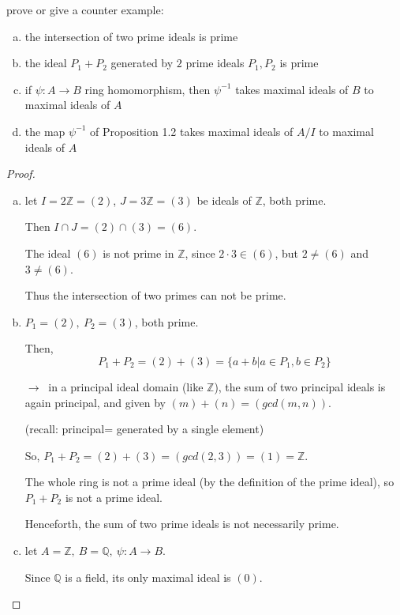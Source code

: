 \documentclass{article}
\theoremstyle{definition}
\newenvironment{ex}[1]
{\renewcommand\theinnerex{#1}\innerex}
{\endinnerex}
\begin{document}
\begin{ex}{R.1.6}
  prove or give a counter example:
  \begin{enumerate}[a.]
    \item the intersection of two prime ideals is prime
    \item the ideal $P_1+P_2$ generated by $2$ prime ideals $P_1,P_2$ is prime
    \item if $\psi: A \longrightarrow B$ ring homomorphism, then $\psi^{-1}$ takes maximal ideals of $B$ to maximal ideals of $A$
    \item the map $\psi^{-1}$ of Proposition 1.2 takes maximal ideals of $A/I$
      to maximal ideals of $A$
  \end{enumerate}
\end{ex}
\begin{proof}
  \begin{enumerate}[a.]
    \item let $I = 2 \mathbb{Z} = (2)$, $J = 3 \mathbb{Z} = (3)$ be ideals of $\mathbb{Z}$, both prime.

      Then $I \cap J = (2) \cap (3) = (6)$.

      The ideal $(6)$ is not prime in $\mathbb{Z}$, since $2 \cdot 3 \in (6)$, but $2 \neq (6)$ and $3 \neq (6)$.

      Thus the intersection of two primes can not be prime.

    \item $P_1=(2),~ P_2=(3)$, both prime.

      Then,
      $$P_1 + P_2 = (2)+(3)=\{ a+b | a \in P_1, b \in P_2 \}$$

      $\longrightarrow~$ in a principal ideal domain (like $\mathbb{Z}$), the sum of two principal ideals is again principal, and given by $(m)+(n)=(gcd(m,n))$.

      (recall: principal= generated by a single element)

      So, $P_1+P_2= (2)+(3) = (gcd(2,3))=(1)=\mathbb{Z}$.

      The whole ring is not a prime ideal (by the definition of the prime ideal), so $P_1+P_2$ is not a prime ideal.

      Henceforth, the sum of two prime ideals is not necessarily prime.

    \item let $A=\mathbb{Z},~ B=\mathbb{Q},~ \psi: A \longrightarrow B$.

      Since $\mathbb{Q}$ is a field, its only maximal ideal is $(0)$.


\end{enumerate}
\end{proof}
\end{document}

